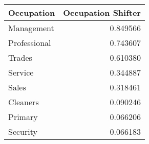 \begin{tabular}{lr}
\toprule
Occupation & Occupation Shifter \\
\midrule
Management & 0.849566 \\
Professional & 0.743607 \\
Trades & 0.610380 \\
Service & 0.344887 \\
Sales & 0.318461 \\
Cleaners & 0.090246 \\
Primary & 0.066206 \\
Security & 0.066183 \\
\bottomrule
\end{tabular}
